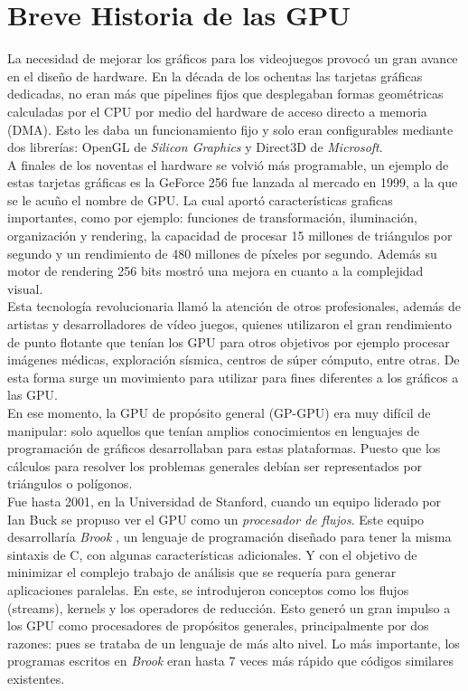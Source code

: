 \section{Breve Historia de las GPU}
La necesidad de mejorar los gráficos para los videojuegos provocó un gran avance en el diseño de hardware. En la década de los ochentas las tarjetas gráficas dedicadas, no eran más que pipelines fijos que desplegaban formas geométricas calculadas por el CPU por medio del hardware de acceso directo a memoria (DMA). Esto les daba un funcionamiento fijo y solo eran configurables mediante dos librerías: OpenGL de \textit{Silicon Graphics} y Direct3D de \textit{Microsoft}.\\
A finales de los noventas el hardware se volvió más programable, un ejemplo de estas tarjetas gráficas es la GeForce 256\cite{GeForce256} fue lanzada al mercado en 1999, a la que se le acuño el nombre de GPU. La cual aportó características graficas importantes, como por ejemplo: funciones de  transformación, iluminación, organización y rendering, la capacidad de procesar 15 millones de triángulos por segundo y un rendimiento de 480 millones de píxeles por segundo. Además su motor de rendering  256 bits mostró una mejora en cuanto a la complejidad visual.\\
Esta tecnología revolucionaria llamó la atención de otros profesionales, además de artistas y desarrolladores de vídeo juegos, quienes utilizaron el gran rendimiento de punto flotante que tenían los GPU para otros objetivos por ejemplo procesar imágenes médicas, exploración sísmica, centros de súper cómputo, entre otras\cite{aplicaciones}. De esta forma surge un movimiento para utilizar para fines diferentes a los gráficos a las GPU.\\
En ese momento, la GPU de propósito general (GP-GPU) era muy difícil de manipular: solo aquellos que tenían amplios conocimientos en lenguajes de programación de gráficos desarrollaban para estas plataformas. Puesto que los cálculos para resolver los problemas generales debían ser representados por triángulos o polígonos.\\
Fue hasta 2001, en la Universidad de Stanford, cuando un equipo liderado por Ian Buck se propuso ver el GPU como un  \textit{procesador de flujos}. Este equipo desarrollaría \textit{Brook} \cite{Buck2001}, un lenguaje de programación diseñado para tener la misma sintaxis de C, con algunas características adicionales. Y con el objetivo de minimizar el complejo trabajo de análisis que se requería para generar aplicaciones paralelas. En este, se introdujeron  conceptos como los flujos (streams), kernels y los operadores de reducción. Esto generó un gran impulso a los GPU como procesadores de propósitos generales, principalmente por dos razones: pues se trataba de un lenguaje de más alto nivel. Lo más importante, los programas escritos en \textit{Brook} eran hasta 7 veces más rápido que códigos similares existentes.\\
